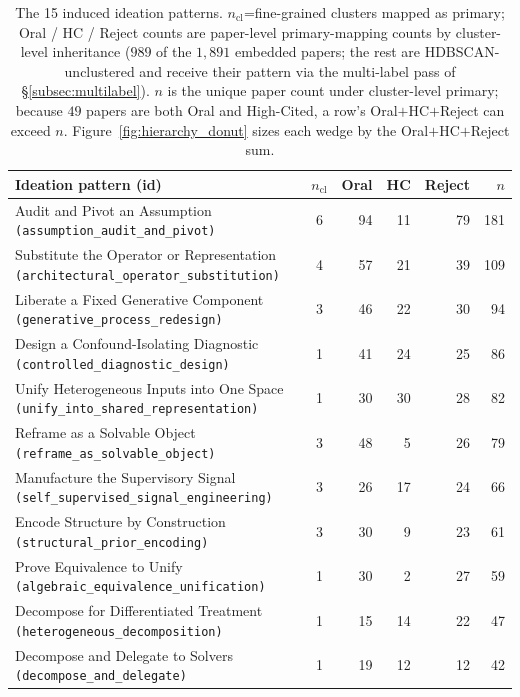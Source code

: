 \documentclass[10pt,a4paper]{article}
\begin{document}
\begin{table}[!htbp]
\centering
\caption{The 15 induced ideation patterns. \(n_\text{cl}\)=fine-grained clusters mapped as primary; Oral / HC / Reject counts are paper-level primary-mapping counts by cluster-level inheritance ($989$ of the $1{,}891$ embedded papers; the rest are HDBSCAN-unclustered and receive their pattern via the multi-label pass of \S\ref{subsec:multilabel}). $n$ is the unique paper count under cluster-level primary; because $49$ papers are both Oral and High-Cited, a row's Oral${+}$HC${+}$Reject can exceed $n$. Figure~\ref{fig:hierarchy_donut} sizes each wedge by the Oral${+}$HC${+}$Reject sum.}
\label{tab:tax}
\small
\begin{tabular}{p{7cm} c rrrr}
\toprule
\textbf{Ideation pattern (id)} & \textbf{\(n_\text{cl}\)} & \textbf{Oral} & \textbf{HC} & \textbf{Reject} & \textbf{$n$} \\
\midrule
Audit and Pivot an Assumption \texttt{(assumption\_audit\_and\_pivot)}                & 6 & 94 & 11 & 79 & 181 \\
Substitute the Operator or Representation \texttt{(architectural\_operator\_substitution)} & 4 & 57 & 21 & 39 & 109 \\
Liberate a Fixed Generative Component \texttt{(generative\_process\_redesign)}        & 3 & 46 & 22 & 30 & 94 \\
Design a Confound-Isolating Diagnostic \texttt{(controlled\_diagnostic\_design)}      & 1 & 41 & 24 & 25 & 86 \\
Unify Heterogeneous Inputs into One Space \texttt{(unify\_into\_shared\_representation)} & 1 & 30 & 30 & 28 & 82 \\
Reframe as a Solvable Object \texttt{(reframe\_as\_solvable\_object)}                 & 3 & 48 &  5 & 26 & 79 \\
Manufacture the Supervisory Signal \texttt{(self\_supervised\_signal\_engineering)}   & 3 & 26 & 17 & 24 & 66 \\
Encode Structure by Construction \texttt{(structural\_prior\_encoding)}               & 3 & 30 &  9 & 23 & 61 \\
Prove Equivalence to Unify \texttt{(algebraic\_equivalence\_unification)}             & 1 & 30 &  2 & 27 & 59 \\
Decompose for Differentiated Treatment \texttt{(heterogeneous\_decomposition)}        & 1 & 15 & 14 & 22 & 47 \\
Decompose and Delegate to Solvers \texttt{(decompose\_and\_delegate)}                 & 1 & 19 & 12 & 12 & 42 \\

\end{tabular}
\end{table}
\end{document}
